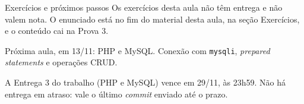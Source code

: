 \documentclass{beamer}
\begin{document}
\begin{frame}{Exercícios e próximos passos}
	Os exercícios desta aula não têm entrega e não valem nota. O enunciado
	está no fim do material desta aula, na seção Exercícios, e o conteúdo cai
	na Prova 3.

	\vspace{0.3cm}
	Próxima aula, em 13/11: PHP e MySQL. Conexão com \texttt{mysqli},
	\emph{prepared statements} e operações CRUD.

	\vspace{0.3cm}
	A Entrega 3 do trabalho (PHP e MySQL) vence em 29/11, às 23h59. Não há
	entrega em atraso: vale o último \emph{commit} enviado até o prazo.
\end{frame}
\end{document}
